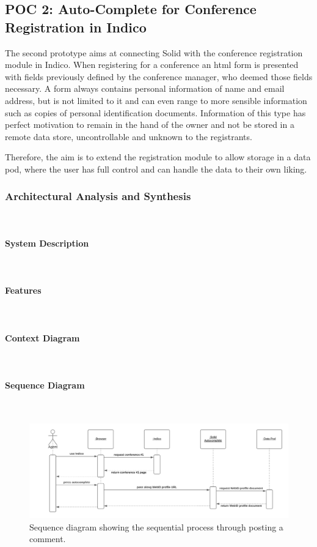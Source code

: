 \subsection{POC 2: Auto-Complete for Conference Registration in Indico}

The second prototype aims at connecting Solid with the conference registration module in Indico. When registering for a conference an \gls{html} form is presented with fields previously defined by the conference manager, who deemed those fields necessary. A form always contains personal information of name and email address, but is not limited to it and can even range to more sensible information such as copies of personal identification documents. Information of this type has perfect motivation to remain in the hand of the owner and not be stored in a remote data store, uncontrollable and unknown to the registrants.

Therefore, the aim is to extend the registration module to allow storage in a data pod, where the user has full control and can handle the data to their own liking.

\subsubsection{Architectural Analysis and Synthesis}\mbox{}\\

\paragraph{System Description}\mbox{}\\
\paragraph{Features}\mbox{}\\
\paragraph{Context Diagram}\mbox{}\\
\paragraph{Sequence Diagram}\mbox{}\\

\begin{figure}[H]
    \centering
    \includegraphics[width=\textwidth]{prototype/graphs/poc-conference_registration-autocomplete-sequence_diagram.png}
    \caption{Sequence diagram showing the sequential process through posting a comment.}
    \label{fig:poc-conference_registration-autocomplete-sequence_diagram}
\end{figure}

